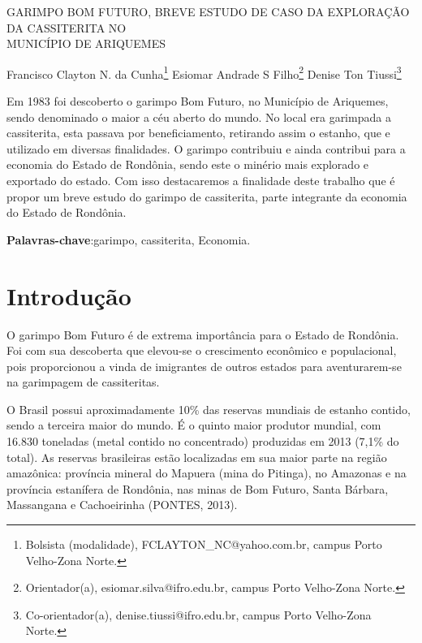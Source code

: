 \documentclass[article,12pt,onesidea,4paper,english,brazil]{abntex2}
\begin{document}
	
	
	\frenchspacing 
	
	\begin{center}
		\LARGE GARIMPO BOM FUTURO, BREVE ESTUDO DE CASO DA EXPLORAÇÃO DA CASSITERITA NO\\MUNICÍPIO DE ARIQUEMES
		
		\normalsize
		Francisco Clayton N. da Cunha\footnote{Bolsista (modalidade), FCLAYTON\_NC@yahoo.com.br, campus Porto Velho-Zona Norte.} 
	Esiomar Andrade S Filho\footnote{Orientador(a), esiomar.silva@ifro.edu.br, campus Porto Velho-Zona Norte.} 
	Denise Ton Tiussi\footnote{Co-orientador(a), denise.tiussi@ifro.edu.br, campus Porto Velho-Zona Norte.}
	\end{center}
	
	\begin{resumoumacoluna}
	Em 1983 foi descoberto o garimpo Bom Futuro, no Município de Ariquemes, sendo denominado o maior a céu aberto do mundo. No local era garimpada a cassiterita, esta passava por beneficiamento, retirando assim o estanho, que e utilizado em diversas finalidades. O garimpo contribuiu e ainda contribui para a economia do Estado de Rondônia, sendo este o minério mais explorado e exportado do estado. Com isso destacaremos a finalidade deste trabalho que é propor um breve estudo do garimpo de cassiterita, parte integrante da economia do Estado de Rondônia.
	
		\vspace{\onelineskip}
		
		\noindent
		\textbf{Palavras-chave}:garimpo, cassiterita, Economia.
	\end{resumoumacoluna}
	
	\section*{Introdução}
	
O garimpo Bom Futuro é de extrema importância para o Estado de Rondônia. Foi com sua descoberta que elevou-se o crescimento econômico e populacional, pois proporcionou a vinda de imigrantes de outros estados para aventurarem-se na garimpagem de cassiteritas.

O Brasil possui aproximadamente 10\% das reservas mundiais de estanho contido, sendo a terceira maior do mundo. É o quinto maior produtor mundial, com 16.830 toneladas (metal contido no concentrado) produzidas em 2013 (7,1\% do total). As reservas brasileiras estão localizadas em sua maior parte na região amazônica: província mineral do Mapuera (mina do Pitinga), no Amazonas e na província estanífera de Rondônia, nas minas de Bom Futuro, Santa Bárbara, Massangana e Cachoeirinha (PONTES, 2013).
\end{document}
